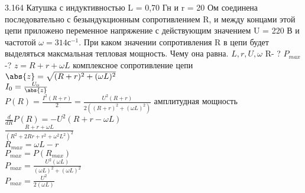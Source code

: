\testCom
{%
	3.164
}
{%
	Катушка с индуктивностью L = 0,70 Гн и r = 20 Ом соединена последовательно с безындукционным сопротивлением R, и между концами этой цепи приложено переменное напряжение с действующим значением U = 220 В и частотой $\omega = 314 с^{-1}$. При каком значении  сопротивления R в цепи будет выделяться максмальная тепловая мощность. Чему она равна.
}
{%
	$L, r, U, \omega$
}
{%
	R- ? 
	${P}_{max} $-?
}
{%
	$z=R+r+\omega L$ комплексное сопротивление цепи\\
	$\abs{z}=\sqrt{(R+r)^2 + (\omega L)^2}$\\
	${I}_{0} = \frac{{U}_{0}}{\abs{z}}$\\
	$P(R)=\frac{I^2(R+r)}{2}=\frac{U^2(R + r)}{2((R + r)^2 + (\omega L)^2)}$ амплитудная мощность\\
	$\frac{d}{dR}P(R)=-U^2(R+r -\omega L)$\\
	$\frac{R+r+\omega L}{(R^2+ 2Rr+r^2+\omega^2 L^2)^2}$\\
	${R}_{max}=\omega L - r$\\
	${P}_{max}=P({R}_{max})$\\
	${P}_{max}= \frac{U^2(\omega L)}{(\omega L)^2 + (\omega L)^2}$\\
	${P}_{max}=\frac{U^2}{2(\omega L)}$\\
}


